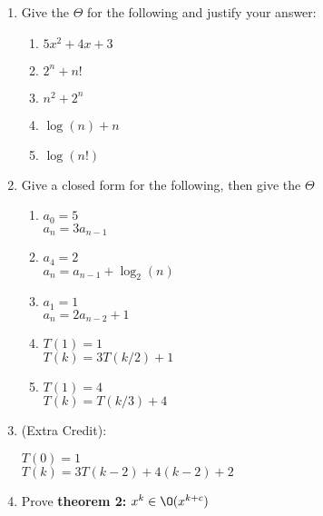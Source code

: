 \documentclass[basic, header]{nosvagor-notes}
\begin{document}
\begin{enumerate}[itemsep=4em]

  \item Give the \(\Theta\) for the following and justify your answer:
    \begin{enumerate}[itemsep=4em]

      \item $5x^2 + 4x + 3$

      \item $2^n + n!$

      \item $n^2 + 2^n$

      \item $\log(n) + n$

      \item $\log(n!)$

    \end{enumerate}
  \newpage %

  \item Give a closed form for the following, then give the $\Theta$
     \begin{enumerate}[itemsep=4em]

      \item $a_0 = 5$\\
        $a_n = 3a_{n-1}$
      \item $a_4 = 2$\\
        $a_n = a_{n-1} + \log_2(n)$
      \item $a_1 = 1$\\
        $a_n = 2a_{n-2} + 1$
      \item $T(1) = 1$\\
        $T(k) = 3T(k/2) + 1$
      \item $T(1) = 4$\\
        $T(k) = T(k/3) + 4$

    \end{enumerate}

  \item (Extra Credit):

  $T(0) = 1$\\
  $T(k) = 3T(k-2) + 4(k-2) + 2$

  \newpage %

  \item Prove \textbf{theorem 2:} $x^k \in \O(x^{k + c})$


\end{enumerate}
\end{document}
